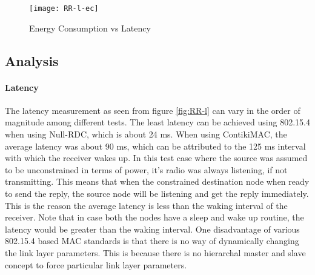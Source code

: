 \begin{figure}[h]
\texttt{[image: RR-l-ec]}
\caption{Energy Consumption vs Latency}
\label{fig:RR-l-ec}
\end{figure}

\subsection{Analysis}
\paragraph{Latency}
The latency measurement as seen from figure \ref{fig:RR-l} can vary in the order of magnitude among different tests. The least latency can be achieved using 802.15.4 when using Null-RDC, which is about 24 ms.  When using ContikiMAC, the average latency was about 90 ms, which can be attributed to the 125 ms interval with which the receiver wakes up. In this test case where the source was assumed to be unconstrained in terms of power, it's radio was always listening, if not transmitting. This means that when the constrained destination node when ready to send the reply, the source node will be listening and get the reply immediately. This is the reason the average latency is less than the waking interval of the receiver. Note that in case both the nodes have a sleep and wake up routine, the latency would be greater than the waking interval. One disadvantage of various 802.15.4 based MAC standards is that there is no way of dynamically changing the link layer parameters. This is because there is no hierarchal master and slave concept to force particular link layer parameters.

